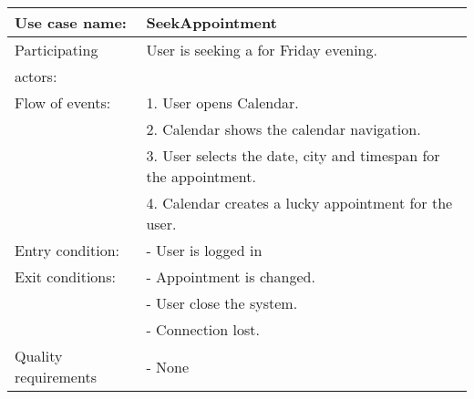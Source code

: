{\tabulinesep=1.2mm
\begin{tabu}{ | p{3cm} | p{13cm} |}
    \hline
    Use case name: 			& 		SeekAppointment\\ \hline
    Participating  			& 		User is seeking a for Friday evening. \\
    actors:					&		\\ \hline
    Flow of events: 		& 		1. User opens Calendar. \\
							&		2. Calendar shows the calendar navigation.\\
							&		3. User selects the date, city and timespan for the appointment.\\
							&		4. Calendar creates a lucky appointment for the user.\\\hline
    Entry condition: 		& 		- User is logged in  \\ \hline
	Exit conditions: 		&		- Appointment is changed.\\
							&		- User close the system.\\
							&		- Connection lost.\\\hline
	Quality requirements	&	 	- None \\\hline
\end{tabu}
}